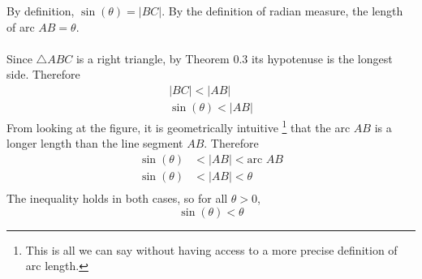 \documentclass{article}
\begin{document}
	By definition, $\sin{(\theta)} = |BC|$. By the definition of radian measure, the length of arc $AB = \theta$.  \\\\
	Since $\triangle ABC$ is a right triangle, by Theorem 0.3 its hypotenuse is the longest side. Therefore
	\begin{align*}
		|BC| < |AB| \\
		\sin{(\theta)} < |AB|
	\end{align*}
	From looking at the figure, it is geometrically intuitive \footnote{This is all we can say without having access to a more precise definition of arc length.} that the arc $AB$ is a longer length than the line segment $AB$. Therefore
	\begin{align*}
		\sin{(\theta)} &< |AB| < \text{arc } AB \\
		\sin{(\theta)} &< |AB| < \theta \\
	\end{align*}
	The inequality holds in both cases, so for all $\theta > 0$,
	$$\sin{(\theta)} < \theta$$
\end{document}
